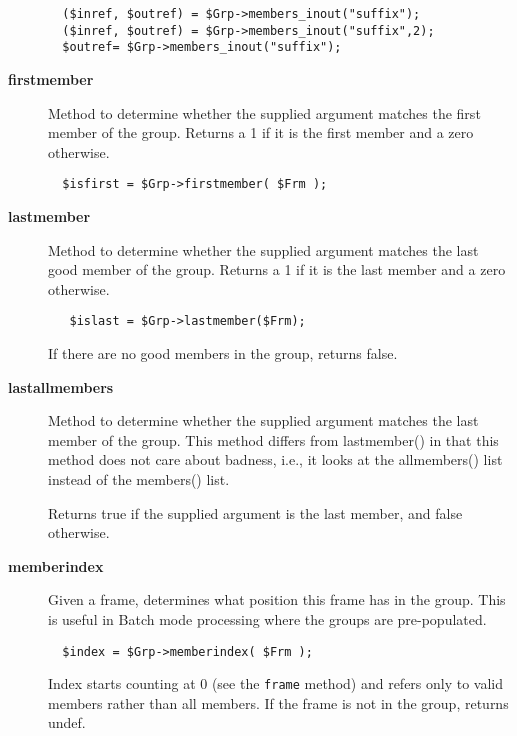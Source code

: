\begin{description}
\begin{verbatim}
  ($inref, $outref) = $Grp->members_inout("suffix");
  ($inref, $outref) = $Grp->members_inout("suffix",2);
  $outref= $Grp->members_inout("suffix");
\end{verbatim}

\item[{\textbf{firstmember}}] \mbox{}

Method to determine whether the supplied argument matches the first
member of the group. Returns a 1 if it is the first member and a zero
otherwise.

\begin{verbatim}
  $isfirst = $Grp->firstmember( $Frm );
\end{verbatim}

\item[{\textbf{lastmember}}] \mbox{}

Method to determine whether the supplied argument
matches the last good member of the group. Returns a 1 if
it is the last member and a zero otherwise.

\begin{verbatim}
   $islast = $Grp->lastmember($Frm);
\end{verbatim}


If there are no good members in the group, returns false.


\item[{\textbf{lastallmembers}}] \mbox{}

Method to determine whether the supplied argument matches the last
member of the group. This method differs from lastmember() in that
this method does not care about badness, i.e., it looks at the
allmembers() list instead of the members() list.



Returns true if the supplied argument is the last member, and false
otherwise.


\item[{\textbf{memberindex}}] \mbox{}

Given a frame, determines what position this frame has in the
group. This is useful in Batch mode processing where the
groups are pre-populated.

\begin{verbatim}
  $index = $Grp->memberindex( $Frm );
\end{verbatim}


Index starts counting at 0 (see the \texttt{frame} method)
and refers only to valid members rather than all members.
If the frame is not in the group, returns undef.



\end{description}
